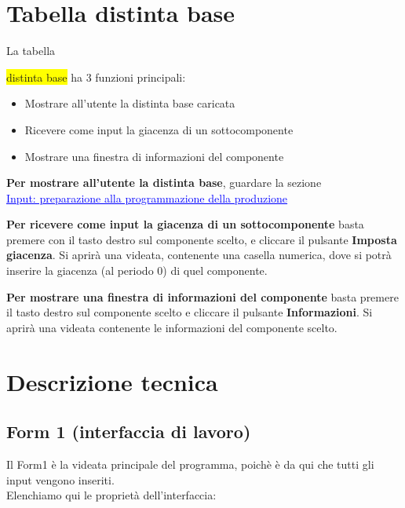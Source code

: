 \documentclass[12pt,twoside]{report}
\begin{document}

\section{Tabella distinta base}

\hypertarget{tabDistintaBase}{La tabella} \colorbox{yellow}{distinta base} ha 3 funzioni principali:

\begin{itemize}
	
	\item Mostrare all'utente la distinta base caricata
	\item Ricevere come input la giacenza di un sottocomponente
	\item Mostrare una finestra di informazioni del componente\\
	      	
\end{itemize}

\textbf{Per mostrare all'utente la distinta base}, guardare la sezione\\ \hyperlink{inputProduzione}{\textcolor{blue}{\underline{Input: preparazione alla programmazione della produzione}}}

\bigskip
\textbf{Per ricevere come input la giacenza di un sottocomponente} basta premere con il tasto destro sul componente scelto, e cliccare il pulsante \textbf{Imposta giacenza}. Si aprirà una videata, contenente una casella numerica, dove si potrà inserire la giacenza (al periodo 0) di quel componente.

\bigskip
\textbf{Per mostrare una finestra di informazioni del componente} basta premere il tasto destro sul componente scelto e cliccare il pulsante \textbf{Informazioni}. Si aprirà una videata contenente le informazioni del componente scelto.


\section{Descrizione tecnica}

\subsection{Form 1 (interfaccia di lavoro)}

Il Form1 è la videata principale del programma, poichè è da qui che tutti gli input vengono inseriti.\\
Elenchiamo qui le proprietà dell'interfaccia:
\end{document}
